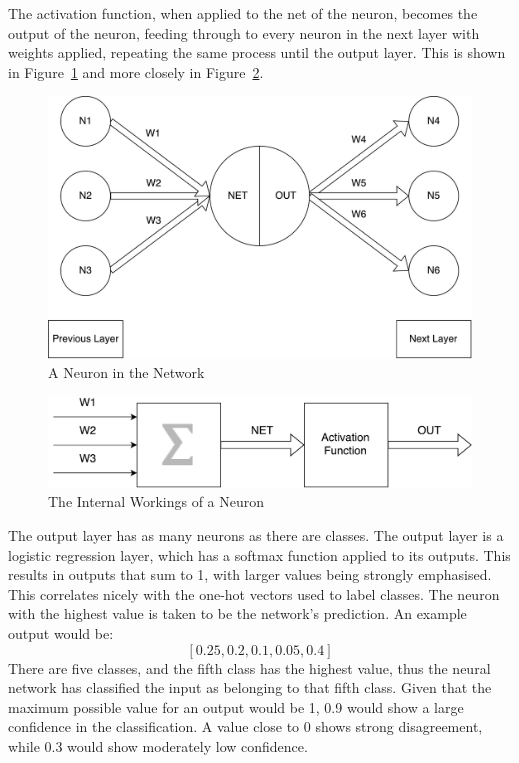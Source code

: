 The activation function, when applied to the net of the neuron, becomes the output of the neuron, feeding through to every neuron in the next layer with weights applied, repeating the same process until the output layer. This is shown in Figure~\ref{fig:multi_neuron} and more closely in Figure~\ref{fig:multi_neuron_close}. 
 
 \begin{figure}[!h]
 	\centering
 	\includegraphics[width=\textwidth]{figures/multilayer_perceptron_neuron}
 	\centering
 	\caption{A Neuron in the Network}
 	\label{fig:multi_neuron}
 \end{figure}

\begin{figure}[!h]
	\centering
	\includegraphics[width=\textwidth]{figures/multilayer_perceptron_neuron2}
	\centering
	\caption{The Internal Workings of a Neuron}
	\label{fig:multi_neuron_close}
\end{figure}
 
 
The output layer has as many neurons as there are classes. The output layer is a logistic regression layer, which has a softmax function applied to its outputs. This results in outputs that sum to 1, with larger values being strongly emphasised. This correlates nicely with the one-hot vectors used to label classes\cite{dunne1997pairing}. The neuron with the highest value is taken to be the network's prediction. An example output would be:
 \[ [0.25, 0.2, 0.1, 0.05, 0.4] \] 
There are five classes, and the fifth class has the highest value, thus the neural network has classified the input as belonging to that fifth class. Given that the maximum possible value for an output would be 1, 0.9 would show a large confidence in the classification. A value close to 0 shows strong disagreement, while 0.3 would show moderately low confidence.
 
